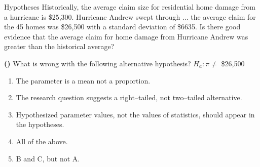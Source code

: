 \documentclass[13pt]{beamer}
\newcounter{count}
\newcommand{\question}{ \textbf{(\decimal{count})} \stepcounter{count}}
\begin{document}
\begin{frame}{Hypotheses}
Historically, the average claim size for residential home damage from a hurricane is \$25,300. Hurricane Andrew swept through $\ldots$  the average claim for the 45 homes was \$26,500 with a standard deviation of \$6635. Is there good evidence that the average claim for home damage from Hurricane Andrew was greater than the historical average?\smallskip

\question What is wrong with the following alternative hypothesis?\quad 
$H_a:\pi \neq $ \$26,500
\begin{enumerate}[A]
   \item The parameter is a mean not a proportion.
   \item The research question suggests a right--tailed, not two--tailed alternative.
   \item Hypothesized parameter values, not the values of statistics, should appear in the hypotheses.
   \item All of the above.%
   \item B and C, but not A.
\end{enumerate}
\end{frame}

\end{document}
